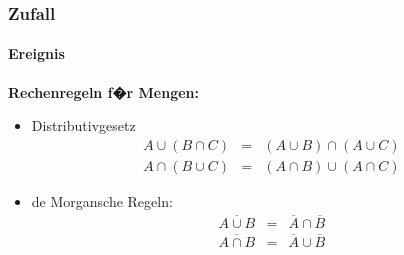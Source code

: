 \documentclass[12pt,show notes]{beamer}
\begin{document}
\begin{frame}
\frametitle{Zufall}
\framesubtitle{Ereignis}
\textbf{Rechenregeln f�r Mengen:}
\begin{itemize}
\item Distributivgesetz
\begin{eqnarray*}
A\cup (B\cap C) &=&(A\cup B)\cap(A\cup C)\\
A\cap (B\cup C) &=&(A\cap B)\cup(A\cap C)
\end{eqnarray*}
\item de Morgansche Regeln:
\begin{eqnarray*}
\overline{A\cup B} &=&\overline{A}\cap \overline{B} \\
\overline{A\cap B} &=&\overline{A}\cup \overline{B}
\end{eqnarray*}
\end{itemize}
\end{frame}
\end{document}
